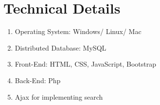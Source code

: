 \documentclass[11pt]{report}
\begin{document}
\section*{Technical Details}

\begin{enumerate}
\item Operating System: Windows/ Linux/ Mac
\item Distributed Database: MySQL
\item Front-End: HTML, CSS, JavaScript, Bootstrap
\item Back-End: Php
\item Ajax for implementing search


 
\end{enumerate}

\newpage
\end{document}
